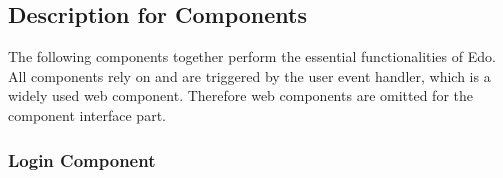 \documentclass[paper=a4, fontsize=11pt]{scrartcl}
\numberwithin{equation}{section}		%
\numberwithin{figure}{section}			%
\numberwithin{table}{section}				%
\begin{document}
\subsection{Description for Components}

The following components together perform the essential functionalities of Edo. All components rely on and are triggered by the user event handler, which is a widely used web component. Therefore web components are omitted for the component interface part.

\subsubsection{Login Component}
\end{document}
